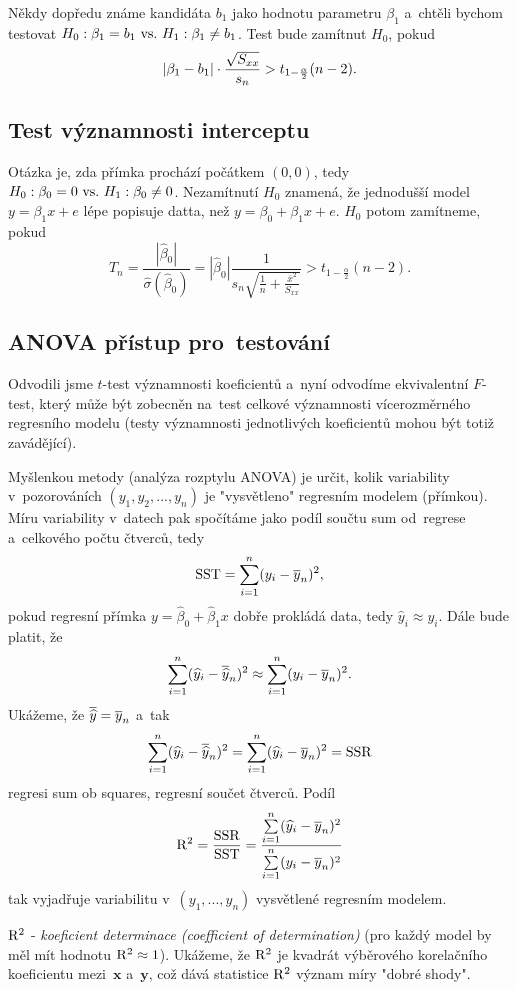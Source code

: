 \begin{remark}
	Někdy dopředu známe kandidáta $b_1$ jako hodnotu parametru $\beta_1$ a~chtěli bychom testovat 
	$H_0: \beta_1=b_1 ~\text{vs.}~ H_1: \beta_1\neq b_1$. Test bude zamítnut $H_0$, pokud 
	$$ \left|\beta_1-b_1\right|\cdot \frac{\sqrt{S_{xx}}}{s_n}> t_{1-\frac{\alpha}{2}}(n-2). $$
\end{remark}
\subsection{Test významnosti interceptu}
Otázka je, zda přímka prochází počátkem $(0,0)$, tedy $H_0: \beta_0=0 ~\text{vs.}~ H_1: \beta_0\neq0$. Nezamítnutí $H_0$ znamená, že jednodušší model $y=\beta_1 x+e$ lépe popisuje datta, než $y=\beta_0+\beta_1 x+e$. $H_0$ potom zamítneme, pokud
$$ T_n=\frac{|\widehat{\beta}_0|}{\widehat{\sigma}(\widehat{\beta}_0)}=|\widehat{\beta}_0|\frac{1}{s_n\sqrt{\frac{1}{n}+\frac{\overline{x}^2}{S_{xx}}}}>t_{1-\frac{\alpha}{2}}(n-2). $$

\subsection{ANOVA přístup pro~testování}
Odvodili jsme $t$-test významnosti koeficientů a~nyní odvodíme ekvivalentní $F$-test, který může být zobecněn na~test celkové významnosti vícerozměrného regresního modelu (testy významnosti jednotlivých koeficientů mohou být totiž zavádějící). 

Myšlenkou metody (analýza rozptylu ANOVA) je určit, kolik variability v~pozorováních $(y_1,y_2,...,y_n)$ je "vysvětleno" regresním modelem (přímkou). Míru variability v~datech pak spočítáme jako podíl součtu sum od~regrese a~celkového počtu čtverců, tedy
$$ \mathrm{SST}=\sum_{i=1}^{n}(y_i-\overline{y}_n)^2, $$
pokud regresní přímka $y=\widehat{\beta}_0+\widehat{\beta}_1 x$ dobře prokládá data, tedy $\widehat{y}_i\approx y_i$. Dále bude platit, že 
$$ \sum\limits_{i=1}^{n} (\widehat{y}_i-\overline{\widehat{y}}_n)^2\approx\sum\limits_{i=1}^{n} (y_i-\overline{y}_n)^2. $$
Ukážeme, že $\overline{\widehat{y}}=\overline{y}_n$ a~tak 
$$ \sum\limits_{i=1}^{n}(\widehat{y}_i-\overline{\widehat{y}}_n)^2=\sum\limits_{i=1}^{n} (\widehat{y}_i-\overline{y}_n)^2=\mathrm{SSR} $$ regresi sum ob squares, regresní součet čtverců. Podíl
$$ \mathrm{R}^2=\frac{\mathrm{SSR}}{\mathrm{SST}}=\frac{\sum\limits_{i=1}^{n} (\widehat{y}_i-\overline{y}_n)^2}{\sum\limits_{i=1}^{n} (y_i-\overline{y}_n)^2}$$ tak vyjadřuje variabilitu v~$(y_1,...,y_n)$ vysvětlené regresním modelem. 

$\mathrm{R}^2$ - \textit{koeficient determinace (coefficient of determination)} (pro každý model by měl mít hodnotu $\mathrm{R}^2\approx 1$). Ukážeme, že $\mathrm{R}^2$ je kvadrát výběrového korelačního koeficientu mezi~$\textbf{x}$ a~$\textbf{y}$, což dává statistice $\mathrm{R}^2$ význam míry "dobré shody". 

